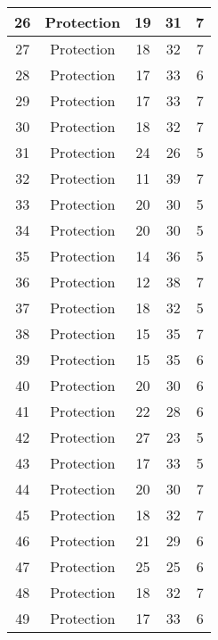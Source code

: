\documentclass[results.tex]{subfiles}
\begin{document}
\begin{center}
\begin{tabular}{| c || c | c | c | c |}
    \hline
    26 & Protection & 19 & 31 & 7 \\ 
    \hline
    27 & Protection & 18 & 32 & 7 \\ 
    \hline
    28 & Protection & 17 & 33 & 6 \\ 
    \hline
    29 & Protection & 17 & 33 & 7 \\ 
    \hline
    30 & Protection & 18 & 32 & 7 \\ 
    \hline
    31 & Protection & 24 & 26 & 5 \\ 
    \hline
    32 & Protection & 11 & 39 & 7 \\ 
    \hline
    33 & Protection & 20 & 30 & 5 \\ 
    \hline
    34 & Protection & 20 & 30 & 5 \\ 
    \hline
    35 & Protection & 14 & 36 & 5 \\ 
    \hline
    36 & Protection & 12 & 38 & 7 \\ 
    \hline
    37 & Protection & 18 & 32 & 5 \\ 
    \hline
    38 & Protection & 15 & 35 & 7 \\ 
    \hline
    39 & Protection & 15 & 35 & 6 \\ 
    \hline
    40 & Protection & 20 & 30 & 6 \\ 
    \hline
    41 & Protection & 22 & 28 & 6 \\ 
    \hline
    42 & Protection & 27 & 23 & 5 \\ 
    \hline
    43 & Protection & 17 & 33 & 5 \\ 
    \hline
    44 & Protection & 20 & 30 & 7 \\ 
    \hline
    45 & Protection & 18 & 32 & 7 \\ 
    \hline
    46 & Protection & 21 & 29 & 6 \\ 
    \hline
    47 & Protection & 25 & 25 & 6 \\ 
    \hline
    48 & Protection & 18 & 32 & 7 \\ 
    \hline
    49 & Protection & 17 & 33 & 6 \\ 
    \hline   \end{tabular}
\end{center}
\end{document}
